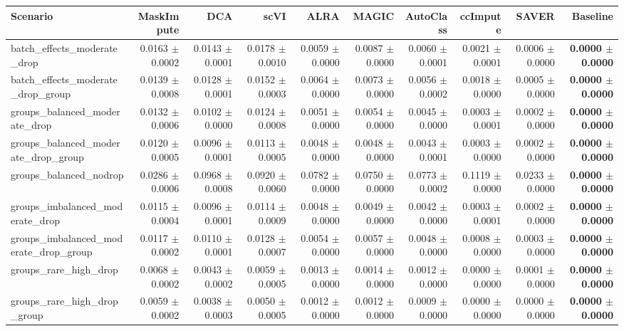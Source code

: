\begin{tabular}{@{}lrrrrrrrrr@{}}
\toprule
Scenario & MaskImpute & DCA & scVI & ALRA & MAGIC & AutoClass & ccImpute & SAVER & Baseline \\
\midrule
batch\_effects\_moderate\_drop & 0.0163 $\pm$ 0.0002 & 0.0143 $\pm$ 0.0001 & 0.0178 $\pm$ 0.0010 & 0.0059 $\pm$ 0.0000 & 0.0087 $\pm$ 0.0000 & 0.0060 $\pm$ 0.0001 & 0.0021 $\pm$ 0.0001 & 0.0006 $\pm$ 0.0000 & \textbf{0.0000 $\pm$ 0.0000} \\
batch\_effects\_moderate\_drop\_group & 0.0139 $\pm$ 0.0008 & 0.0128 $\pm$ 0.0001 & 0.0152 $\pm$ 0.0003 & 0.0064 $\pm$ 0.0000 & 0.0073 $\pm$ 0.0000 & 0.0056 $\pm$ 0.0002 & 0.0018 $\pm$ 0.0000 & 0.0005 $\pm$ 0.0000 & \textbf{0.0000 $\pm$ 0.0000} \\
groups\_balanced\_moderate\_drop & 0.0132 $\pm$ 0.0006 & 0.0102 $\pm$ 0.0000 & 0.0124 $\pm$ 0.0008 & 0.0051 $\pm$ 0.0000 & 0.0054 $\pm$ 0.0000 & 0.0045 $\pm$ 0.0000 & 0.0003 $\pm$ 0.0001 & 0.0002 $\pm$ 0.0000 & \textbf{0.0000 $\pm$ 0.0000} \\
groups\_balanced\_moderate\_drop\_group & 0.0120 $\pm$ 0.0005 & 0.0096 $\pm$ 0.0001 & 0.0113 $\pm$ 0.0005 & 0.0048 $\pm$ 0.0000 & 0.0048 $\pm$ 0.0000 & 0.0043 $\pm$ 0.0001 & 0.0003 $\pm$ 0.0000 & 0.0002 $\pm$ 0.0000 & \textbf{0.0000 $\pm$ 0.0000} \\
groups\_balanced\_nodrop & 0.0286 $\pm$ 0.0006 & 0.0968 $\pm$ 0.0008 & 0.0920 $\pm$ 0.0060 & 0.0782 $\pm$ 0.0000 & 0.0750 $\pm$ 0.0000 & 0.0773 $\pm$ 0.0002 & 0.1119 $\pm$ 0.0000 & 0.0233 $\pm$ 0.0000 & \textbf{0.0000 $\pm$ 0.0000} \\
groups\_imbalanced\_moderate\_drop & 0.0115 $\pm$ 0.0004 & 0.0096 $\pm$ 0.0001 & 0.0114 $\pm$ 0.0009 & 0.0048 $\pm$ 0.0000 & 0.0049 $\pm$ 0.0000 & 0.0042 $\pm$ 0.0000 & 0.0003 $\pm$ 0.0001 & 0.0002 $\pm$ 0.0000 & \textbf{0.0000 $\pm$ 0.0000} \\
groups\_imbalanced\_moderate\_drop\_group & 0.0117 $\pm$ 0.0002 & 0.0110 $\pm$ 0.0001 & 0.0128 $\pm$ 0.0007 & 0.0054 $\pm$ 0.0000 & 0.0057 $\pm$ 0.0000 & 0.0048 $\pm$ 0.0000 & 0.0008 $\pm$ 0.0000 & 0.0003 $\pm$ 0.0000 & \textbf{0.0000 $\pm$ 0.0000} \\
groups\_rare\_high\_drop & 0.0068 $\pm$ 0.0002 & 0.0043 $\pm$ 0.0002 & 0.0059 $\pm$ 0.0005 & 0.0013 $\pm$ 0.0000 & 0.0014 $\pm$ 0.0000 & 0.0012 $\pm$ 0.0000 & 0.0000 $\pm$ 0.0000 & 0.0001 $\pm$ 0.0000 & \textbf{0.0000 $\pm$ 0.0000} \\
groups\_rare\_high\_drop\_group & 0.0059 $\pm$ 0.0002 & 0.0038 $\pm$ 0.0003 & 0.0050 $\pm$ 0.0005 & 0.0012 $\pm$ 0.0000 & 0.0012 $\pm$ 0.0000 & 0.0009 $\pm$ 0.0000 & 0.0000 $\pm$ 0.0000 & 0.0000 $\pm$ 0.0000 & \textbf{0.0000 $\pm$ 0.0000} \\

\end{tabular}
